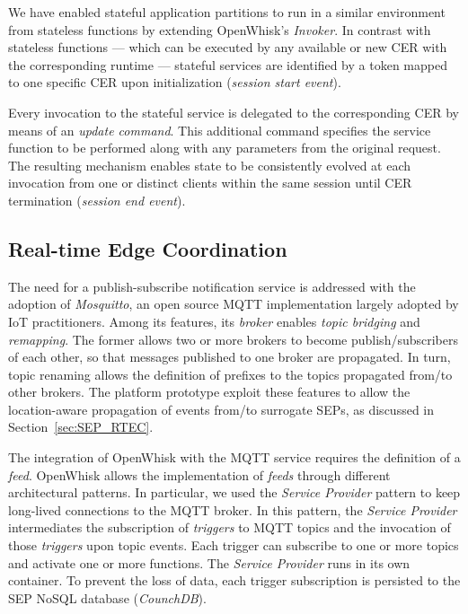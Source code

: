 We have enabled stateful application partitions to run in a similar environment from stateless functions by extending OpenWhisk's \textit{Invoker}. In contrast with stateless functions --- which can be executed by any available or new CER with the corresponding runtime --- stateful services are identified by a token mapped to one specific CER upon initialization (\textit{session start event}). 

Every invocation to the stateful service is delegated to the corresponding CER by means of an \textit{update command}. This additional command specifies the service function to be performed along with any parameters from the original request. The resulting mechanism enables state to be consistently evolved at each invocation from one or distinct clients within the same session until CER termination (\textit{session end event}).


\subsection{Real-time Edge Coordination}


The need for a publish-subscribe notification service is addressed with the adoption of \textit{Mosquitto}, an open source MQTT implementation largely adopted by IoT practitioners. %
Among its features, its \textit{broker} enables \textit{topic bridging} and \textit{remapping}. The former allows two or more brokers to become publish/subscribers of each other, so that messages published to one broker are propagated. In turn, topic renaming allows the definition of prefixes to the topics propagated from/to other brokers. The platform prototype exploit these features to allow the location-aware propagation of events from/to surrogate SEPs, as discussed in Section~\ref{sec:SEP_RTEC}. %

The integration of OpenWhisk with the MQTT service requires the definition of a \textit{feed}.
OpenWhisk allows the implementation of \textit{feeds} through different architectural patterns. In particular, we used the \textit{Service Provider} pattern to keep long-lived connections to the MQTT broker. In this pattern, the \textit{Service Provider} intermediates the subscription of \textit{triggers} to MQTT topics and the invocation of those \textit{triggers} upon topic events. Each trigger can subscribe to one or more topics and activate one or more functions. The \textit{Service Provider} runs in its own container. To prevent the loss of data, each trigger subscription is persisted to the SEP NoSQL database (\textit{CounchDB}).


